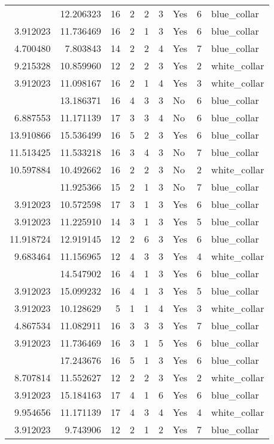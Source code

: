 \documentclass[
]{article}
\begin{document}
\begin{longtable}[t]{rrrrrllrl}
\addlinespace
9.800901 & 12.206323 & 16 & 2 & 2 & 3 & Yes & 6 & blue\_collar\\
3.912023 & 11.736469 & 16 & 2 & 1 & 3 & Yes & 6 & blue\_collar\\
4.700480 & 7.803843 & 14 & 2 & 2 & 4 & Yes & 7 & blue\_collar\\
9.215328 & 10.859960 & 12 & 2 & 2 & 3 & Yes & 2 & white\_collar\\
3.912023 & 11.098167 & 16 & 2 & 1 & 4 & Yes & 3 & white\_collar\\
\addlinespace
10.546656 & 13.186371 & 16 & 4 & 3 & 3 & No & 6 & blue\_collar\\
6.887553 & 11.171139 & 17 & 3 & 3 & 4 & No & 6 & blue\_collar\\
13.910866 & 15.536499 & 16 & 5 & 2 & 3 & Yes & 6 & blue\_collar\\
11.513425 & 11.533218 & 16 & 3 & 4 & 3 & No & 7 & blue\_collar\\
10.597884 & 10.492662 & 16 & 2 & 2 & 3 & No & 2 & white\_collar\\
\addlinespace
3.912023 & 11.925366 & 15 & 2 & 1 & 3 & No & 7 & blue\_collar\\
3.912023 & 10.572598 & 17 & 3 & 1 & 3 & Yes & 6 & blue\_collar\\
3.912023 & 11.225910 & 14 & 3 & 1 & 3 & Yes & 5 & blue\_collar\\
11.918724 & 12.919145 & 12 & 2 & 6 & 3 & Yes & 6 & blue\_collar\\
9.683464 & 11.156965 & 12 & 4 & 3 & 3 & Yes & 4 & white\_collar\\
\addlinespace
3.912023 & 14.547902 & 16 & 4 & 1 & 3 & Yes & 6 & blue\_collar\\
3.912023 & 15.099232 & 16 & 4 & 1 & 3 & Yes & 5 & blue\_collar\\
3.912023 & 10.128629 & 5 & 1 & 1 & 4 & Yes & 3 & white\_collar\\
4.867534 & 11.082911 & 16 & 3 & 3 & 3 & Yes & 7 & blue\_collar\\
3.912023 & 11.736469 & 16 & 3 & 1 & 5 & Yes & 6 & blue\_collar\\
\addlinespace
3.912023 & 17.243676 & 16 & 5 & 1 & 3 & Yes & 6 & blue\_collar\\
8.707814 & 11.552627 & 12 & 2 & 2 & 3 & Yes & 2 & white\_collar\\
3.912023 & 15.184163 & 17 & 4 & 1 & 6 & Yes & 6 & blue\_collar\\
9.954656 & 11.171139 & 17 & 4 & 3 & 4 & Yes & 4 & white\_collar\\
3.912023 & 9.743906 & 12 & 2 & 1 & 2 & Yes & 7 & blue\_collar\\

\end{longtable}
\end{document}
